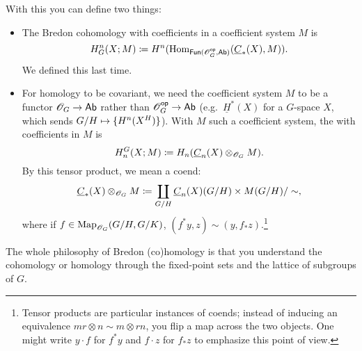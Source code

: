 With this you can define two things:
\begin{itemize}
	\item The Bredon cohomology with coefficients in a coefficient system $M$ is
	\[H_G^n(X;M) \coloneqq H^n(\operatorname{Hom}_{\mathsf{Fun}(\mathscr O_G^{\mathsf{op}}, \mathsf{Ab})}(\underline C_*(X), M)).\]
	We defined this last time.
	\item For homology to be covariant, we need the coefficient system $M$ to be a functor $\mathscr O_G\to\mathsf{Ab}$ rather
	than $\mathscr O_G^{\mathsf{op}}\to\mathsf{Ab}$ (e.g.\ $\underline H^*(X)$ for a $G$-space $X$, which sends $G/H\mapsto\set{H^n(X^H)}$).
	With $M$ such a coefficient system, the  with coefficients in $M$ is
	\[H_n^G(X; M) \coloneqq H_n(\underline C_n(X)\otimes_{\mathscr O_G} M).\]
	By this tensor product, we mean a coend:
	\[\underline C_*(X)\otimes_{\mathscr O_G} M \coloneqq \coprod_{G/H} \underline C_n(X)(G/H)\times M(G/H)/\sim,\]
	where if $f\in\operatorname{Map}_{\mathscr O_G}(G/H, G/K)$, $(f^*y, z)\sim (y, f_*z)$.\footnote{Tensor products are particular
	instances of coends; instead of inducing an equivalence $mr\otimes n\sim m\otimes rn$, you flip a map across
	the two objects. One might write $y\cdot f$ for $f^* y$ and $f\cdot z$ for $f_* z$ to emphasize this point of view.}
\end{itemize}
The whole philosophy of Bredon (co)homology is that you understand the cohomology or homology through the
fixed-point sets and the lattice of subgroups of $G$.
